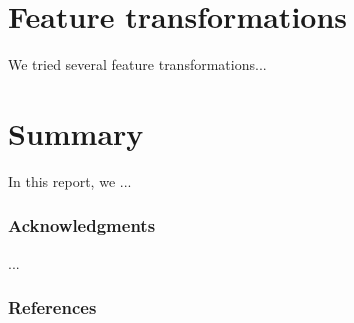 \documentclass{article} %
\begin{document}
\section{Feature transformations}
We tried several feature transformations...


\section{Summary}
In this report, we ...


\subsubsection*{Acknowledgments}
...

\subsubsection*{References}
\end{document}

